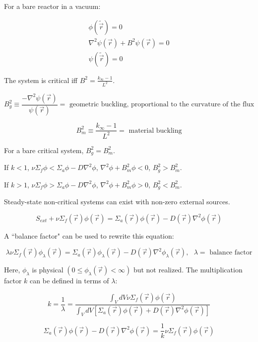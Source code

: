 \documentclass[12pt]{article}
\newcommand{\rvec}{\ensuremath{\vec{r}}}
\newcommand{\vecr}{\ensuremath{\vec{r}}}
\begin{document}
For a bare reactor in a vacuum:

\begin{gather*}
\phi(\tilde{\rvec}) = 0 \\
\nabla^2\psi(\rvec) + B^2\psi(\rvec) = 0 \\
\psi(\tilde{\rvec}) = 0
\end{gather*}

The system is critical iff $B^2 = \frac{k_{\infty} - 1}{L^2}$.

\begin{equation*}
B_g^2 \equiv \frac{-\nabla^2\psi(\rvec)}{\psi(\vecr)} = 
\text{ geometric buckling, proportional to the curvature of the flux}
\end{equation*}

\begin{equation*}
B_m^2 \equiv \frac{k_{\infty} - 1}{L^2} = \text{ material buckling}
\end{equation*}

For a bare critical system, $B_g^2 = B_m^2$.


If $k < 1$, $\nu\Sigma_f\phi < \Sigma_a\phi - D\nabla^2\phi$, $\nabla^2\phi + B_m^2\phi < 0$, 
$B_g^2 > B_m^2$.


If $k > 1$, $\nu\Sigma_f\phi > \Sigma_a\phi - D\nabla^2\phi$, $\nabla^2\phi + B_m^2\phi > 0$, 
$B_g^2 < B_m^2$.


Steady-state non-critical systems can exist with non-zero external sources.

\begin{equation*}
S_{ext} + \nu\Sigma_f(\rvec)\phi(\rvec) = \Sigma_a(\rvec)\phi(\rvec) - D(\rvec)\nabla^2\phi(\rvec)
\end{equation*}

A ``balance factor" can be used to rewrite this equation:

\begin{equation*}
\lambda\nu\Sigma_f(\rvec)\phi_{\lambda}(\rvec) = 
\Sigma_a(\rvec)\phi_{\lambda}(\rvec) - D(\rvec)\nabla^2\phi_{\lambda}(\rvec), 
\text{ $\lambda =$ balance factor}
\end{equation*}

Here, $\phi_{\lambda}$ is physical $(0\leq\phi_{\lambda}(\rvec)<\infty)$ but not realized. The
multiplication factor $k$ can be defined in terms of $\lambda$:

\begin{equation*}
k = \frac{1}{\lambda} = 
\frac{\int_VdV\nu\Sigma_f(\rvec)\phi(\rvec)}{\int_VdV[\Sigma_a(\rvec)\phi(\rvec)+D(\rvec)\nabla^2\phi(\rvec)]}
\end{equation*}

\begin{equation*}
\Sigma_a(\rvec)\phi(\rvec) - D(\rvec)\nabla^2\phi(\rvec) = \frac{1}{k}\nu\Sigma_f(\rvec)\phi(\rvec)
\end{equation*}

\end{document}
